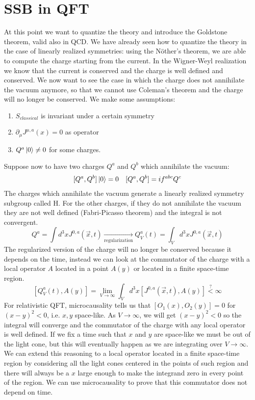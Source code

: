 \documentclass[../main.tex]{subfiles}
\begin{document}
\section{SSB in QFT}
At this point we want to quantize the theory and introduce the Goldstone theorem, valid also in QCD. We have already seen how to quantize the theory in the case of linearly realized symmetries: using the N\"other's theorem, we are able to compute the charge starting from the current. In the Wigner-Weyl realization we know that the current is conserved and the charge is well defined and conserved. We now want to see the case in which the charge does not annihilate the vacuum anymore, so that we cannot use Coleman's theorem and the charge will no longer be conserved. We make some assumptions:
\begin{enumerate}
    \item $S_{classical}$ is invariant under a certain symmetry
    \item $\partial_\mu J^{\mu,a}(x)=0$ as operator
    \item $Q^a\ket{0}\neq0$ for some charges.
\end{enumerate}
Suppose now to have two charges $Q^a$ and $Q^b$ which annihilate the vacuum:
\[
[Q^a,Q^b]\ket{0}=0 \quad [Q^a,Q^b]=if^{abc}Q^c
\]
The charges which annihilate the vacuum generate a linearly realized symmetry subgroup called H. For the other charges, if they do not annihilate the vacuum they are not well defined (Fabri-Picasso theorem) and the integral is not convergent.
\[
Q^a=\int d^3xJ^{0,a}(\Vec{x},t)\xrightarrow[\text{regularization}]{}Q^a_V(t)=\int_V d^3xJ^{0,a}(\Vec{x},t)
\]
The regularized version of the charge will no longer be conserved because it depends on the time, instead we can look at the commutator of the charge with a local operator $A$ located in a point $A(y)$ or located in a finite space-time region.
\[
[Q_V^a(t),A(y)]=\lim_{V\to\infty}\int_Vd^3x[J^{0,a}(\Vec{x},t),A(y)]\stackrel{?}{<}\infty
\]
For relativistic QFT, microcausality tells us that $[O_1(x),O_2(y)]=0$ for $(x-y)^2<0$, i.e. $x,y$ space-like. As $V\to\infty$, we will get $(x-y)^2<0$ so the integral will converge and the commutator of the charge with any local operator is well defined. If we fix a time such that $x$ and $y$ are space-like we must be out of the light cone, but this will eventually happen as we are integrating over $V\to\infty$. We can extend this reasoning to a local operator located in a finite space-time region by considering all the light cones centered in the points of such region and there will always be a $x$ large enough to make the integrand zero in every point of the region. We can use microcausality to prove that this commutator does not depend on time.
\end{document}

